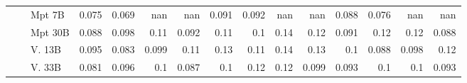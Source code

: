 \begin{table}[!htbp]
{\begin{tabular}{l|l|l|rrrr|rrrr|rrrr}
 &  & Mpt 7B & {\cellcolor[HTML]{C4E8BD}} \color[HTML]{000000} 0.075 & {\cellcolor[HTML]{CCEBC6}} \color[HTML]{000000} 0.069 & {\cellcolor[HTML]{000000}} \color[HTML]{F1F1F1} nan & {\cellcolor[HTML]{000000}} \color[HTML]{F1F1F1} nan & {\cellcolor[HTML]{FDDAB6}} \color[HTML]{000000} 0.091 & {\cellcolor[HTML]{FDDAB6}} \color[HTML]{000000} 0.092 & {\cellcolor[HTML]{000000}} \color[HTML]{F1F1F1} nan & {\cellcolor[HTML]{000000}} \color[HTML]{F1F1F1} nan & {\cellcolor[HTML]{BBBBDB}} \color[HTML]{000000} 0.088 & {\cellcolor[HTML]{CBCBE3}} \color[HTML]{000000} 0.076 & {\cellcolor[HTML]{000000}} \color[HTML]{F1F1F1} nan & {\cellcolor[HTML]{000000}} \color[HTML]{F1F1F1} nan \\
 &  & Mpt 30B & {\cellcolor[HTML]{B1E0AB}} \color[HTML]{000000} 0.088 & {\cellcolor[HTML]{A0D99B}} \color[HTML]{000000} 0.098 & {\cellcolor[HTML]{92D28F}} \color[HTML]{000000} 0.11 & {\cellcolor[HTML]{AADDA4}} \color[HTML]{000000} 0.092 & {\cellcolor[HTML]{FDCFA0}} \color[HTML]{000000} 0.11 & {\cellcolor[HTML]{FDD5AB}} \color[HTML]{000000} 0.1 & {\cellcolor[HTML]{FDB678}} \color[HTML]{000000} 0.14 & {\cellcolor[HTML]{FDC088}} \color[HTML]{000000} 0.12 & {\cellcolor[HTML]{B6B6D8}} \color[HTML]{000000} 0.091 & {\cellcolor[HTML]{8683BD}} \color[HTML]{F1F1F1} 0.12 & {\cellcolor[HTML]{8D89C0}} \color[HTML]{F1F1F1} 0.12 & {\cellcolor[HTML]{BBBBDB}} \color[HTML]{000000} 0.088 \\
 &  & V. 13B  & {\cellcolor[HTML]{A7DBA0}} \color[HTML]{000000} 0.095 & {\cellcolor[HTML]{B8E3B2}} \color[HTML]{000000} 0.083 & {\cellcolor[HTML]{9FD899}} \color[HTML]{000000} 0.099 & {\cellcolor[HTML]{8BCF89}} \color[HTML]{000000} 0.11 & {\cellcolor[HTML]{FDC088}} \color[HTML]{000000} 0.13 & {\cellcolor[HTML]{FDCD9C}} \color[HTML]{000000} 0.11 & {\cellcolor[HTML]{FDB576}} \color[HTML]{000000} 0.14 & {\cellcolor[HTML]{FDB97D}} \color[HTML]{000000} 0.13 & {\cellcolor[HTML]{A29FCB}} \color[HTML]{F1F1F1} 0.1 & {\cellcolor[HTML]{BBBBDB}} \color[HTML]{000000} 0.088 & {\cellcolor[HTML]{ACAAD1}} \color[HTML]{000000} 0.098 & {\cellcolor[HTML]{908DC2}} \color[HTML]{F1F1F1} 0.12 \\
 &  & V. 33B  & {\cellcolor[HTML]{BBE4B4}} \color[HTML]{000000} 0.081 & {\cellcolor[HTML]{A4DA9E}} \color[HTML]{000000} 0.096 & {\cellcolor[HTML]{97D492}} \color[HTML]{000000} 0.1 & {\cellcolor[HTML]{B2E0AC}} \color[HTML]{000000} 0.087 & {\cellcolor[HTML]{FDD4AA}} \color[HTML]{000000} 0.1 & {\cellcolor[HTML]{FDC189}} \color[HTML]{000000} 0.12 & {\cellcolor[HTML]{FDC38D}} \color[HTML]{000000} 0.12 & {\cellcolor[HTML]{FDD5AD}} \color[HTML]{000000} 0.099 & {\cellcolor[HTML]{B3B3D6}} \color[HTML]{000000} 0.093 & {\cellcolor[HTML]{A9A7CF}} \color[HTML]{F1F1F1} 0.1 & {\cellcolor[HTML]{A8A6CF}} \color[HTML]{F1F1F1} 0.1 & {\cellcolor[HTML]{B3B3D6}} \color[HTML]{000000} 0.093 \\

\end{tabular}}
\end{table}
